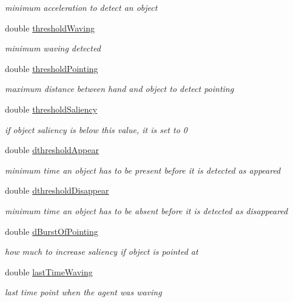 \begin{DoxyCompactItemize}
\begin{DoxyCompactList}\small\item\em minimum acceleration to detect an object \end{DoxyCompactList}\item 
double \hyperlink{group__pasar_af58bfaa1d774a864584a76da4d57be4e}{threshold\+Waving}
\begin{DoxyCompactList}\small\item\em minimum waving detected \end{DoxyCompactList}\item 
double \hyperlink{group__pasar_a291feefbe67ed3e29994c73c4e185948}{threshold\+Pointing}
\begin{DoxyCompactList}\small\item\em maximum distance between hand and object to detect pointing \end{DoxyCompactList}\item 
double \hyperlink{group__pasar_af0ed238a5d456b0ca04f75b3b2576f14}{threshold\+Saliency}
\begin{DoxyCompactList}\small\item\em if object saliency is below this value, it is set to 0 \end{DoxyCompactList}\item 
double \hyperlink{group__pasar_a94cc40d7d4e86e835b05c46d2a4ecea0}{dthreshold\+Appear}
\begin{DoxyCompactList}\small\item\em minimum time an object has to be present before it is detected as appeared \end{DoxyCompactList}\item 
double \hyperlink{group__pasar_a1ac4c61e385a04fc07e764d5f09e9ce4}{dthreshold\+Disappear}
\begin{DoxyCompactList}\small\item\em minimum time an object has to be absent before it is detected as disappeared \end{DoxyCompactList}\item 
double \hyperlink{group__pasar_a55005305cce26c9b3ace35b7a7cd6d99}{d\+Burst\+Of\+Pointing}
\begin{DoxyCompactList}\small\item\em how much to increase saliency if object is pointed at \end{DoxyCompactList}\item 
double \hyperlink{group__pasar_a679e9095d786c28375abe7f87420783b}{last\+Time\+Waving}
\begin{DoxyCompactList}\small\item\em last time point when the agent was waving \end{DoxyCompactList}\item 

\end{DoxyCompactItemize}
